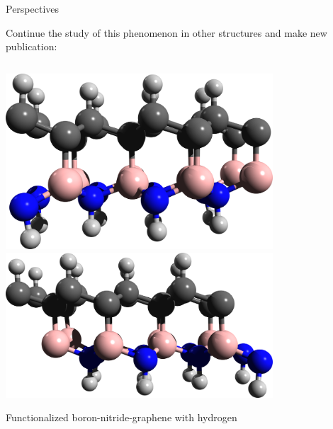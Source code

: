 \documentclass{beamer}
\begin{document}
\begin{frame}

{\Large Perspectives}

\vspace{3mm}

Continue the study of this phenomenon in other structures and make new
publication:

\begin{columns}


\begin{center}
\includegraphics[width=0.78\textwidth]{figs/hnbGh-aa-1.png}\\
\includegraphics[width=0.78\textwidth]{figs/hnbGh-ab-1.png}

Functionalized boron-nitride-graphene with hydrogen
\end{center}




\begin{columns}

\vspace{-4mm}


\end{columns}
\end{columns}
\end{frame}
\end{document}
